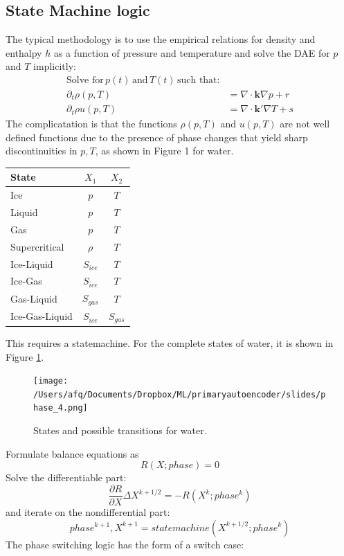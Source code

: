 \documentclass[]{article}
\begin{document}
\hypertarget{header-n3253}{%
\subsection{State Machine logic}\label{header-n3253}}


The typical methodology is to use the empirical relations for density
and enthalpy \(h\) as a function of pressure and temperature and solve
the DAE for \(p\) and \(T\) implicitly:
\begin{align}
\text{Solve for}\, p(t)\, \text{and}\, T(t)\, \text{such that:}\\
\partial_t \rho(p,T) & = \nabla \cdot \mathbf{k}\nabla p + r\\
\partial_t \rho u(p,T) & = \nabla \cdot \mathbf{k'}\nabla T + s
\end{align}
The complicatation is that the functions \(\rho(p,T)\) and \(u(p,T)\)
are not well defined functions due to the presence of phase changes that
yield sharp discontinuities in \(p,T\), as shown in Figure 1 for
water.



\begin{tabular}{l|c|c}
  State & $X_1$ & $X_2$ \\
  \hline
  Ice & $p$ & $T$ \\
  Liquid & $p$ & $T$ \\
  Gas & $p$ & $T$ \\
  Supercritical & $\rho$ & $T$ \\
  Ice-Liquid & $S_{ice}$ & $T$ \\
  Ice-Gas & $S_{ice}$ & $T$ \\
  Gas-Liquid & $S_{gas}$ & $T$ \\
  Ice-Gas-Liquid & $S_{ice}$ & $S_{gas}$ 
\end{tabular}

  This requires a statemachine. For the complete states of water, it is shown in Figure \ref{fig:statemachine}.
  \begin{figure}
    \texttt{[image: /Users/afq/Documents/Dropbox/ML/primaryautoencoder/slides/phase\_4.png]}
    \caption{\label{fig:statemachine}States and possible transitions for water.}
\end{figure}
Formulate balance equations as
\begin{equation}
R(X ; phase) = 0
\end{equation}
Solve the differentiable part:
\[\frac{\partial R}{\partial X}\Delta X^{k+1/2} = -R(X^k ; phase^k)\]
and iterate on the nondifferential part:
\[phase^{k+1},X^{k+1} = statemachine(X^{k+1/2} ; phase^k)\]
The phase switching logic has the form of a switch case:
\end{document}
